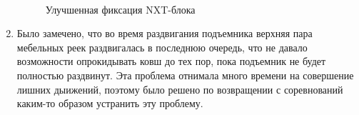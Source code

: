\begin{enumerate}
	\begin{figure}[H]
		\begin{minipage}[h]{0.2\linewidth}
			\center  
		\end{minipage}
		\begin{minipage}[h]{0.6\linewidth}
			\caption{Улучшенная фиксация NXT-блока}
		\end{minipage}
	\end{figure}
	
	\item Было замечено, что во время раздвигания подъемника верхняя пара мебельных реек раздвигалась в последнюю очередь, что не давало возможности опрокидывать ковш до тех пор, пока подъемник не будет полностью раздвинут. Эта проблема отнимала много времени на совершение лишних дыижений, поэтому было решено по возвращении с соревнований каким-то образом устранить эту проблему.
	
\end{enumerate}
\fillpage